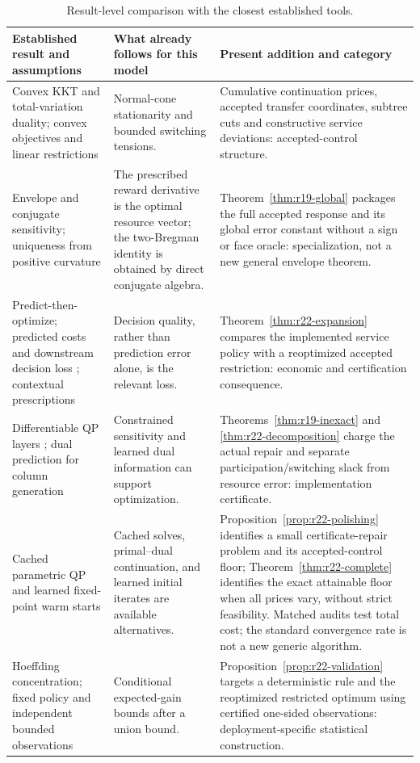 \documentclass[11pt,letterpaper]{article}
\theoremstyle{definition}
\newcommand{\1}{\mathbf 1}
\begin{document}
\begin{table}[tbp]\centering\small
\caption{Result-level comparison with the closest established tools.}
\label{tab:r22-novelty}
\begin{tabular}{p{}p{}p{}}
\toprule
Established result and assumptions & What already follows for this model & Present addition and category\\
\midrule
Convex KKT and total-variation duality; convex objectives and linear restrictions \citep{BoydVandenberghe2004,TibshiraniTaylor2011}
& Normal-cone stationarity and bounded switching tensions.
& Cumulative continuation prices, accepted transfer coordinates, subtree cuts and constructive service deviations: accepted-control structure.\\
Envelope and conjugate sensitivity; uniqueness from positive curvature \citep{BoydVandenberghe2004}
& The prescribed reward derivative is the optimal resource vector; the two-Bregman identity is obtained by direct conjugate algebra.
& Theorem~\ref{thm:r19-global} packages the full accepted response and its global error constant without a sign or face oracle: specialization, not a new general envelope theorem.\\
Predict-then-optimize; predicted costs and downstream decision loss \citep{ElmachtoubGrigas2022}; contextual prescriptions \citep{BertsimasKallus2020}
& Decision quality, rather than prediction error alone, is the relevant loss.
& Theorem~\ref{thm:r22-expansion} compares the implemented service policy with a reoptimized accepted restriction: economic and certification consequence.\\
Differentiable QP layers \citep{AmosKolter2017}; dual prediction for column generation \citep{KraulSeizingerBrunner2023}
& Constrained sensitivity and learned dual information can support optimization.
& Theorems~\ref{thm:r19-inexact} and \ref{thm:r22-decomposition} charge the actual repair and separate participation/switching slack from resource error: implementation certificate.\\
Cached parametric QP and learned fixed-point warm starts \citep{Stellato2020,Sambharya2024}
& Cached solves, primal--dual continuation, and learned initial iterates are available alternatives.
& Proposition~\ref{prop:r22-polishing} identifies a small certificate-repair problem and its accepted-control floor; Theorem~\ref{thm:r22-complete} identifies the exact attainable floor when all prices vary, without strict feasibility. Matched audits test total cost; the standard convergence rate is not a new generic algorithm.\\
Hoeffding concentration; fixed policy and independent bounded observations \citep{Hoeffding1963}
& Conditional expected-gain bounds after a union bound.
& Proposition~\ref{prop:r22-validation} targets a deterministic rule and the reoptimized restricted optimum using certified one-sided observations: deployment-specific statistical construction.\\
\bottomrule
\end{tabular}
\end{table}
\end{document}
